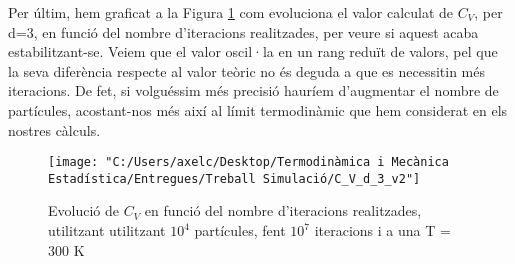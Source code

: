\documentclass{article}
\begin{document}
	Per últim, hem graficat a la Figura \ref{figura_evolucio_C_V}  com evoluciona el valor calculat de $C_V$, per d=3, en funció del nombre d'iteracions realitzades, per veure si aquest acaba estabilitzant-se. Veiem que el valor oscil·la en un rang reduït de valors, pel que la seva diferència respecte al valor teòric no és deguda a que es necessitin més iteracions. De fet, si volguéssim més precisió hauríem d'augmentar el nombre de partícules, acostant-nos més així al límit termodinàmic que hem considerat en els nostres càlculs.
	
\begin{figure}
	\centering
	\texttt{[image: "C:/Users/axelc/Desktop/Termodinàmica i Mecànica Estadística/Entregues/Treball Simulació/C\_V\_d\_3\_v2"]}
	\caption{Evolució de $C_V$ en funció del nombre d'iteracions realitzades, utilitzant utilitzant $10^4$ partícules, fent $10^7$ iteracions i a una T = 300 K}
	\label{figura_evolucio_C_V}
\end{figure}
	
	
\end{document}
